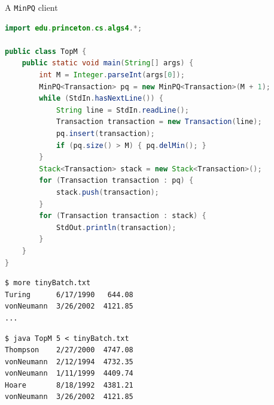 \documentclass[8pt,a4paper,compress]{beamer}
\begin{document}
\begin{frame}[fragile]
\pause

A \lstinline{MinPQ} client
\begin{lstlisting}[language=Java]
import edu.princeton.cs.algs4.*;

public class TopM {   
    public static void main(String[] args) {
        int M = Integer.parseInt(args[0]); 
        MinPQ<Transaction> pq = new MinPQ<Transaction>(M + 1); 
        while (StdIn.hasNextLine()) {
            String line = StdIn.readLine();
            Transaction transaction = new Transaction(line);
            pq.insert(transaction); 
            if (pq.size() > M) { pq.delMin(); }
        }
        Stack<Transaction> stack = new Stack<Transaction>();
        for (Transaction transaction : pq) { 
            stack.push(transaction); 
        }
        for (Transaction transaction : stack) {
            StdOut.println(transaction); 
        } 
    }
} 
\end{lstlisting} 

\pause

\begin{lstlisting}[language={}]
$ more tinyBatch.txt 
Turing      6/17/1990   644.08
vonNeumann  3/26/2002  4121.85
...
\end{lstlisting} 

\pause

\begin{lstlisting}[language={}]
$ java TopM 5 < tinyBatch.txt 
Thompson    2/27/2000  4747.08
vonNeumann  2/12/1994  4732.35
vonNeumann  1/11/1999  4409.74
Hoare       8/18/1992  4381.21
vonNeumann  3/26/2002  4121.85
\end{lstlisting} 
\end{frame}
\end{document}
